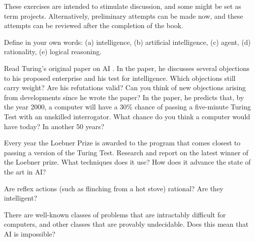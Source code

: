 \noindent These exercises are intended to stimulate discussion, and 
some might be set as term projects.  Alternatively, preliminary 
attempts can be made now, and these attempts can be reviewed after 
the completion of the book.


\begin{exercise}
    Define in your own words: (a) intelligence, (b) artificial 
    intelligence, (c) agent, (d) rationality, (e) logical reasoning.
\end{exercise} 

\begin{uexercise}\libex
Read Turing's original paper on AI \cite{Turing:1950}. In the paper,
he discusses several objections to his proposed enterprise
and his test for intelligence. Which objections
still carry weight? Are his refutations valid? Can you think of
new objections arising from developments since he wrote the paper? In
the paper, he predicts that, by the year 2000, a computer will have a
30\% chance of passing a five-minute Turing Test with an unskilled
interrogator. What chance do you think a computer would have today?
In another 50 years?
\end{uexercise} 

\begin{iexercise}\libex
    Every year the Loebner Prize is awarded to the 
    program that comes 
    closest to passing a version of the Turing Test. Research and 
    report on the latest winner of the Loebner prize.  What techniques 
    does it use? How does it advance the state of the art in AI?
\end{iexercise} 

\begin{exercise}
    Are reflex actions (such as flinching from a hot stove) rational? Are they intelligent?%
\end{exercise}%



\begin{iexercise}
There are well-known classes of problems that are
intractably difficult for computers, and other
classes that are provably undecidable.
Does this mean that AI is impossible?
\end{iexercise} 

